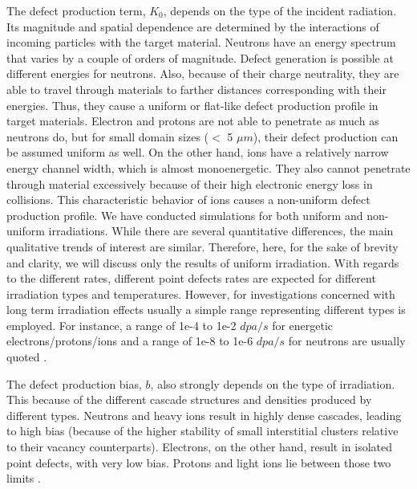 \documentclass[utf8]{frontiersSCNS} %
\begin{document}
    The defect production term, $K_0$, depends on the type of the incident radiation. Its magnitude and spatial dependence are determined by the interactions of incoming particles with the target material. Neutrons have an energy spectrum that varies by a couple of orders of magnitude. Defect generation is possible at different energies for neutrons. Also, because of their charge neutrality, they are able to travel through materials to farther distances corresponding with their energies. Thus, they cause a uniform or flat-like defect production profile in target materials. Electron and protons are not able to penetrate as much as neutrons do, but for small domain sizes ($<$ 5 $\mu m$), their defect production can be assumed uniform as well. On the other hand, ions have a relatively narrow energy channel width, which is almost monoenergetic. They also cannot penetrate through material excessively because of their high electronic energy loss in collisions. This characteristic behavior of ions causes a non-uniform defect production profile. We have conducted simulations for both uniform and non-uniform irradiations. While there are several quantitative differences, the main qualitative trends of interest are similar. Therefore, here, for the sake of brevity and clarity, we will discuss only the results of uniform irradiation. With regards to the different rates, different point defects rates are expected for different irradiation types and temperatures. However, for investigations concerned with long term irradiation effects usually a simple range representing different types is employed. For instance, a range of 1e-4 to 1e-2 $dpa/s$ for energetic electrons/protons/ions and a range of 1e-8 to 1e-6 $dpa/s$ for neutrons are usually quoted \citep{was2017}.
    
    The defect production bias, $b$, also strongly depends on the type of irradiation. This because of the different cascade structures and densities produced by different types. Neutrons and heavy ions result in highly dense cascades, leading to high bias (because of the higher stability of small interstitial clusters relative to their vacancy counterparts). Electrons, on the other hand, result in isolated point defects, with very low bias. Protons and light ions lie between those two limits \citep{was2017}.
\end{document}
